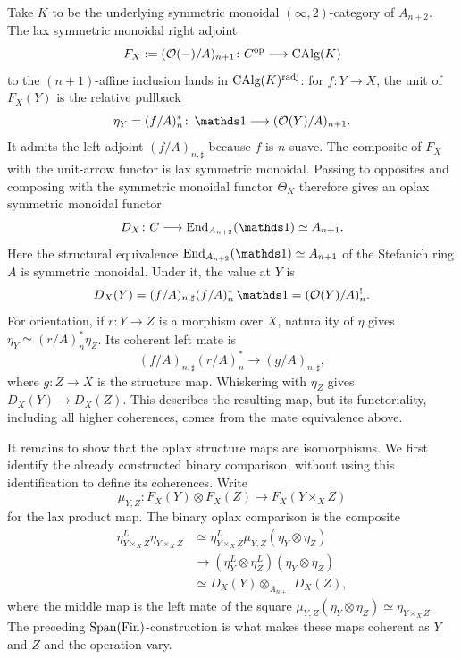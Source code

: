 \documentclass[11pt]{book}
\begin{document}
\begin{construction}
		Take $K$ to be the underlying symmetric monoidal $(\infty,2)$-category of $A_{n+2}$. The lax symmetric monoidal right adjoint
		\[
			F_X:=(\mathcal{O}(-)/A)_{n+1}\colon
			C^{\textup{op}}\longrightarrow{\textup{CAlg}}(K)
		\]
		to the $(n+1)$-affine inclusion lands in ${\textup{CAlg}}(K)^{\mathrm{radj}}$: for $f\colon Y\to X$, the unit of $F_X(Y)$ is the relative pullback
		\[
			\eta_Y=(f/A)^*_n\colon\unit\longrightarrow(\Oo(Y)/A)_{n+1}.
		\]
		It admits the left adjoint $(f/A)_{n,\sharp}$ because $f$ is $n$-suave. The composite of $F_X$ with the unit-arrow functor is lax symmetric monoidal. Passing to opposites and composing with the symmetric monoidal functor $\Theta_K$ therefore gives an oplax symmetric monoidal functor
		\[
			D_X\colon C\longrightarrow\End_{A_{n+2}}(\unit)\simeq A_{n+1}.
		\]
		Here the structural equivalence $\End_{A_{n+2}}(\unit)\simeq A_{n+1}$ of the Stefanich ring $A$ is symmetric monoidal. Under it, the value at $Y$ is
		\[
			D_X(Y)=(f/A)_{n,\sharp}(f/A)^*_n\unit=(\Oo(Y)/A)^!_n.
		\]
		For orientation, if $r\colon Y\to Z$ is a morphism over $X$, naturality of $\eta$ gives $\eta_Y\simeq(r/A)^*_n\eta_Z$. Its coherent left mate is
		\[
			(f/A)_{n,\sharp}(r/A)^*_n\longrightarrow(g/A)_{n,\sharp},
		\]
		where $g\colon Z\to X$ is the structure map. Whiskering with $\eta_Z$ gives $D_X(Y)\to D_X(Z)$. This describes the resulting map, but its functoriality, including all higher coherences, comes from the mate equivalence above.

		It remains to show that the oplax structure maps are isomorphisms. We first identify the already constructed binary comparison, without using this identification to define its coherences. Write
		\[
			\mu_{Y,Z}\colon F_X(Y)\otimes F_X(Z)\longrightarrow F_X(Y\times_XZ)
		\]
		for the lax product map. The binary oplax comparison is the composite
		\begin{align*}
			\eta_{Y\times_XZ}^L\eta_{Y\times_XZ}
			&\simeq \eta_{Y\times_XZ}^L\mu_{Y,Z}(\eta_Y\otimes\eta_Z)\\
			&\longrightarrow (\eta_Y^L\otimes\eta_Z^L)(\eta_Y\otimes\eta_Z)\\
			&\simeq D_X(Y)\otimes_{A_{n+1}}D_X(Z),
		\end{align*}
		where the middle map is the left mate of the square $\mu_{Y,Z}(\eta_Y\otimes\eta_Z)\simeq\eta_{Y\times_XZ}$. The preceding $\operatorname{Span}({\textup{Fin}})$-construction is what makes these maps coherent as $Y$ and $Z$ and the operation vary.


\end{construction}
\end{document}
